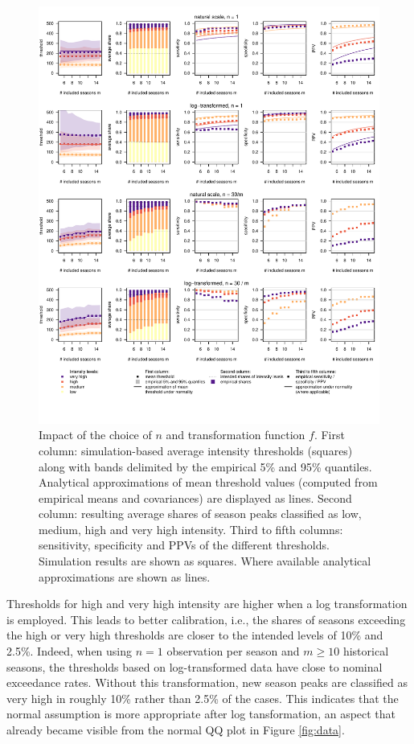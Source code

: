 \documentclass{article}
\begin{document}
\begin{figure}[h!]
\centering
\includegraphics[width=1\textwidth]{figure/plot_fr.pdf}

\vspace{-1.5cm}

\caption{Impact of the choice of $n$ and transformation function $f$. First column: simulation-based average intensity thresholds (squares) along with bands delimited by the empirical 5\% and 95\% quantiles. Analytical approximations of mean threshold values (computed from empirical means and covariances) are displayed as lines. Second column: resulting average shares of season peaks classified as low, medium, high and very high intensity. Third to fifth columns: sensitivity, specificity and PPVs of the different thresholds. Simulation results are shown as squares. Where available analytical approximations are shown as lines.}
\label{fig:results1}
\end{figure}

Thresholds for high and very high intensity are higher when a log transformation is employed. This leads to better calibration, i.e., the shares of seasons exceeding the high or very high thresholds are closer to the intended levels of 10\% and 2.5\%. Indeed, when using $n = 1$ observation per season and $m \geq 10$ historical seasons, the thresholds based on log-transformed data have close to nominal exceedance rates. Without this transformation, new season peaks are classified as very high in roughly 10\% rather than 2.5\% of the cases. This indicates that the normal assumption is more appropriate after log tansformation, an aspect that already became visible from the normal QQ plot in Figure \ref{fig:data}.
\end{document}
